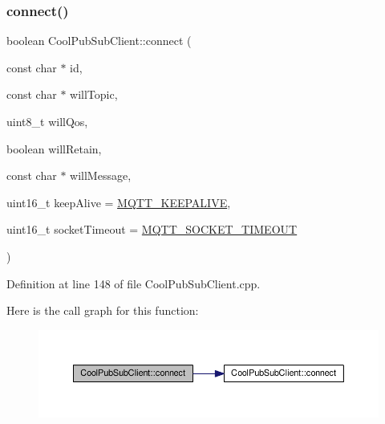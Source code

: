 \subsubsection{\texorpdfstring{connect()}{connect()}\hspace{0.1cm}{\footnotesize\ttfamily [3/4]}}
{\footnotesize\ttfamily boolean Cool\+Pub\+Sub\+Client\+::connect (\begin{DoxyParamCaption}\item[{const char $\ast$}]{id,  }\item[{const char $\ast$}]{will\+Topic,  }\item[{uint8\+\_\+t}]{will\+Qos,  }\item[{boolean}]{will\+Retain,  }\item[{const char $\ast$}]{will\+Message,  }\item[{uint16\+\_\+t}]{keep\+Alive = {\ttfamily \hyperlink{_cool_pub_sub_client_8h_afb4dd8c75385ab30e659314df7c2c335}{M\+Q\+T\+T\+\_\+\+K\+E\+E\+P\+A\+L\+I\+VE}},  }\item[{uint16\+\_\+t}]{socket\+Timeout = {\ttfamily \hyperlink{_cool_pub_sub_client_8h_a092cc564e4d7f03fdab6137e30a7f05b}{M\+Q\+T\+T\+\_\+\+S\+O\+C\+K\+E\+T\+\_\+\+T\+I\+M\+E\+O\+UT}} }\end{DoxyParamCaption})}



Definition at line 148 of file Cool\+Pub\+Sub\+Client.\+cpp.

Here is the call graph for this function\+:
\nopagebreak
\begin{figure}[H]
\begin{center}
\leavevmode
\includegraphics[width=350pt]{class_cool_pub_sub_client_af461a5a08fda1c3237e706965704ddb6_cgraph}
\end{center}
\end{figure}
\mbox{\label{class_cool_pub_sub_client_a7e5a85731dd25d90a41f6d859e61da77}} 
